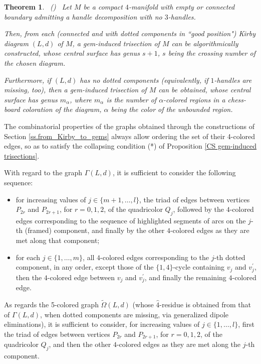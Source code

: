 \documentclass[12pt,a4paper]{article}
\newtheorem{theorem}[lemma]{Theorem}
\begin{document}
\begin{theorem} \label{th_M4(L,c)} \ {\rm (\cite{Casali-Cristofori gem-induced})} \  Let $M$ be a compact %
$4$-manifold with empty or connected boundary admitting a handle decomposition with no $3$-handles.  
\smallskip

\noindent 
Then, from each (connected and with dotted components in ``good position") Kirby diagram $(L,d)$ of $M$, a gem-induced trisection of $M$ can be algorithmically constructed, whose central surface has genus $s+1$, $s$ being the crossing number of the chosen diagram.

\noindent Furthermore, if $(L,d)$ has no dotted components (equivalently, if $1$-handles are missing, too), then a gem-induced trisection of $M$ can be obtained,  whose central surface has genus $m_\alpha$, where $m_{\alpha}$ is the number of $\alpha$-colored regions in a chess-board coloration of the diagram, $\alpha$ being the color of the unbounded region.
\end{theorem} 

\par \noindent  
The combinatorial properties of the graphs obtained through the constructions of Section \ref{ss.from_Kirby_to_gems} 
always allow ordering the set of their 4-colored edges, so as to satisfy the collapsing condition (*) of Proposition \ref{CS gem-induced trisections}. 

With regard to the graph $\Gamma(L,d)$, it is sufficient to consider the following sequence: 
\begin{itemize}
\item   
for increasing values of $j \in \{m+1, \dots, l\}$, the triad of edges between vertices $P_{2r}$ and $P_{2r+1}$, for $r=0,1,2$,  of the quadricolor $Q_j$, followed by the $4$-colored edges corresponding to the sequence  of highlighted segments of arcs on the $j$-th (framed) component, and finally by the other $4$-colored edges as they are met    
along that component; 
\item  for each $j \in \{1, \dots, m\}$, all $4$-colored edges corresponding to the $j$-th dotted component, in any order, except those of the $\{1,4\}$-cycle containing $v_j$ and $v_j^\prime$,  then the $4$-colored edge between  $v_j$ and $v_j^\prime$, and finally  the remaining $4$-colored edge. 
\end{itemize}

As regards the 5-colored graph $\tilde \Omega(L,d)$ (whose $\hat 4$-residue is obtained from that of  
$\Gamma(L,d)$, when dotted components are missing, via generalized dipole eliminations), it is sufficient to consider, for increasing values of $j \in \{1, \dots, l\}$, first the triad of edges between vertices $P_{2r}$ and $P_{2r+1}$, for $r=0,1,2$, of the quadricolor $Q_j$, and then the other $4$-colored edges  as they are  met along the $j$-th component. 
\end{document}
